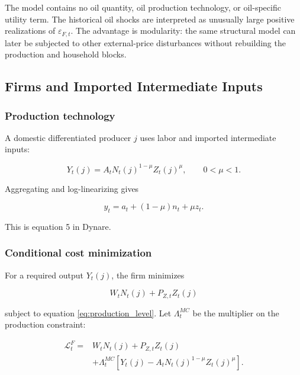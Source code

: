 The model contains no oil quantity, oil production technology, or oil-specific
utility term. The historical oil shocks are interpreted as unusually large
positive realizations of \(\varepsilon_{F,t}\). The advantage is modularity:
the same structural model can later be subjected to other external-price
disturbances without rebuilding the production and household blocks.

\subsection{Firms and Imported Intermediate Inputs}
\label{app:firms}

\subsubsection{Production technology}

A domestic differentiated producer \(j\) uses labor and imported intermediate
inputs:

\begin{equation}
Y_t(j)
=
A_tN_t(j)^{1-\mu}Z_t(j)^\mu,
\qquad
0<\mu<1.
\label{eq:production_level}
\end{equation}

Aggregating and log-linearizing gives

\begin{equation}
\boxed{
y_t
=
a_t+(1-\mu)n_t+\mu z_t.
}
\label{eq:production_final}
\end{equation}

This is equation 5 in Dynare.

\subsubsection{Conditional cost minimization}

For a required output \(Y_t(j)\), the firm minimizes

\begin{equation}
W_tN_t(j)+P_{Z,t}Z_t(j)
\end{equation}

subject to equation \eqref{eq:production_level}. Let \(\Lambda_t^{MC}\) be the
multiplier on the production constraint:

\begin{align}
\mathcal L_t^F
=&
W_tN_t(j)+P_{Z,t}Z_t(j)
\nonumber\\
&+
\Lambda_t^{MC}
\left[
Y_t(j)-A_tN_t(j)^{1-\mu}Z_t(j)^\mu
\right].
\end{align}

